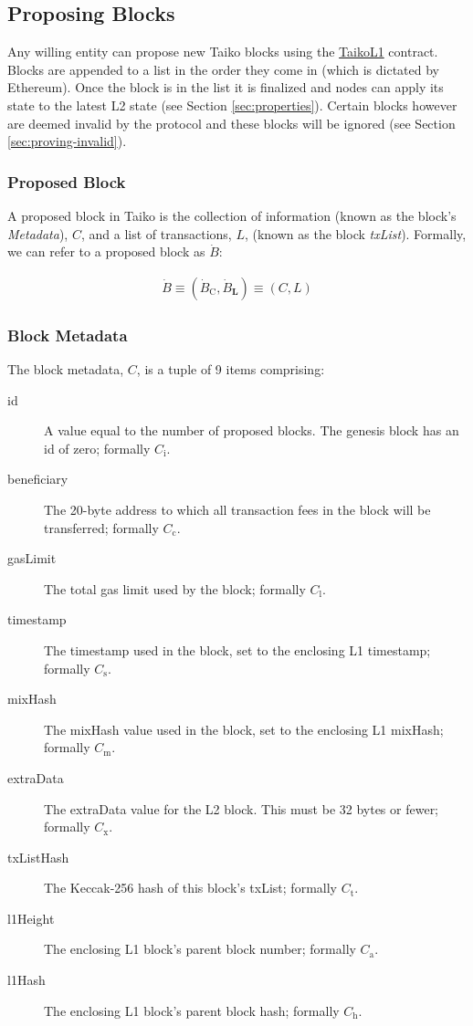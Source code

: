 \documentclass[9pt,oneside]{amsart}
\begin{document}
\begin{multicols}{2}
\subsection{Proposing Blocks}
Any willing entity can propose new Taiko blocks using the {\underline{TaikoL1}} contract. Blocks are appended to a list in the order they come in (which is dictated by Ethereum). Once the block is in the list it is finalized and nodes can apply its state to the latest L2 state (see Section \ref{sec:properties}). Certain blocks however are deemed invalid by the protocol and these blocks will be ignored (see Section \ref{sec:proving-invalid}).

\subsubsection{Proposed Block} A proposed block in Taiko is the collection of information (known as the block's \emph{Metadata}), $C$, and a list of transactions, $L$,  (known as the block \emph{txList}). Formally, we can refer to a proposed block as $\dot{B}$:

\begin{eqnarray}
\dot{B} \equiv (\dot{B}_{\mathrm{C}}, \dot{B}_{\mathbf{L}}) \equiv (C, L)
\end{eqnarray}

\subsubsection{Block Metadata}\label{metadata} The block metadata, $C$, is a tuple of 9 items comprising:

\begin{description}
\item[id] A value equal to the number of proposed blocks. The genesis block has an id of zero; formally $C_{\mathrm{i}}$.
\item[beneficiary] The 20-byte address to which all transaction fees in the block will be transferred; formally $C_{\mathrm{c}}$.
\item[gasLimit] The total gas limit used by the block; formally $C_{\mathrm{l}}$.
\item[timestamp] The timestamp used in the block, set to the enclosing L1 timestamp; formally $C_{\mathrm{s}}$.
\item[mixHash] The mixHash value used in the block, set to the enclosing L1 mixHash; formally $C_{\mathrm{m}}$.
\item[extraData] The extraData value for the L2 block. This must be 32 bytes or fewer; formally $C_{\mathrm{x}}$.
\item[txListHash] The Keccak-256 hash of this block's txList; formally $C_{\mathrm{t}}$. 
\item[l1Height] The enclosing L1 block's parent block number; formally $C_{\mathrm{a}}$.
\item[l1Hash] The enclosing L1 block's parent block hash; formally $C_{\mathrm{h}}$.
\end{description}


\end{multicols}
\end{document}
